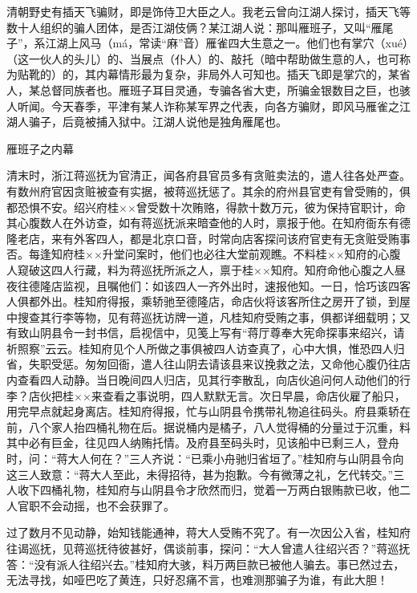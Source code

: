 \documentclass[12pt,UTF8]{ctexbook}
\begin{document}
清朝野史有插天飞骗财，即是饰侍卫大臣之人。我老云曾向江湖人探讨，插天飞等数十人组织的骗人团体，是否江湖伎俩？某江湖人说：那叫雁班子，又叫“雁尾子”，系江湖上风马（má，常读“麻”音）雁雀四大生意之一。他们也有掌穴（xué）（这一伙人的头儿）的、当展点（仆人）的、敲托（暗中帮助做生意的人，也可称为贴靴的）的，其内幕情形最为复杂，非局外人可知也。插天飞即是掌穴的，某省人，某总督同族者也。雁班子耳目灵通，专骗各省大吏，所骗金银数目之巨，也骇人听闻。今天春季，平津有某人诈称某军界之代表，向各方骗财，即风马雁雀之江湖人骗子，后竟被捕入狱中。江湖人说他是独角雁尾也。





雁班子之内幕


清末时，浙江蒋巡抚为官清正，闻各府县官员多有贪赃卖法的，遣人往各处严查。有数州府官因贪赃被查有实据，被蒋巡抚惩了。其余的府州县官吏有曾受贿的，俱都恐惧不安。绍兴府桂××曾受数十次贿赂，得款十数万元，彼为保持官职计，命其心腹数人在外访查，如有蒋巡抚派来暗查他的人时，禀报于他。在知府衙东有德隆老店，来有外客四人，都是北京口音，时常向店客探问该府官吏有无贪赃受贿事否。每逢知府桂××升堂问案时，他们也必往大堂前观瞧。不料桂××知府的心腹人窥破这四人行藏，料为蒋巡抚所派之人，禀于桂××知府。知府命他心腹之人昼夜往德隆店监视，且嘱他们：如该四人一齐外出时，速报他知。一日，恰巧该四客人俱都外出。桂知府得报，乘轿驰至德隆店，命店伙将该客所住之房开了锁，到屋中搜查其行李等物，见有蒋巡抚访牌一道，凡桂知府受贿之事，俱都详细载明；又有致山阴县令一封书信，启视信中，见笺上写有“蒋厅尊奉大宪命探事来绍兴，请祈照察”云云。桂知府见个人所做之事俱被四人访查真了，心中大惧，惟恐四人归省，失职受惩。匆匆回衙，遣人往山阴去请该县来议挽救之法，又命他心腹仍往店内查看四人动静。当日晚间四人归店，见其行李散乱，向店伙追问何人动他们的行李？店伙把桂××来查看之事说明，四人默默无言。次日早晨，命店伙雇了船只，用完早点就起身离店。桂知府得报，忙与山阴县令携带礼物追往码头。府县乘轿在前，八个家人抬四桶礼物在后。据说桶内是橘子，八人觉得桶的分量过于沉重，料其中必有巨金，往见四人纳贿托情。及府县至码头时，见该船中已剩三人，登舟时，问：“蒋大人何在？”三人齐说：“已乘小舟驰归省垣了。”桂知府与山阴县令向这三人致意：“蒋大人至此，未得招待，甚为抱歉。今有微薄之礼，乞代转交。”三人收下四桶礼物，桂知府与山阴县令才欣然而归，觉着一万两白银贿款已收，他二人官职不会动摇，也不会获罪了。

过了数月不见动静，始知钱能通神，蒋大人受贿不究了。有一次因公入省，桂知府往谒巡抚，见蒋巡抚待彼甚好，偶谈前事，探问：“大人曾遣人往绍兴否？”蒋巡抚答：“没有派人往绍兴去。”桂知府大骇，料万两巨款已被他人骗去。事已然过去，无法寻找，如哑巴吃了黄连，只好忍痛不言，也难测那骗子为谁，有此大胆！
\end{document}
